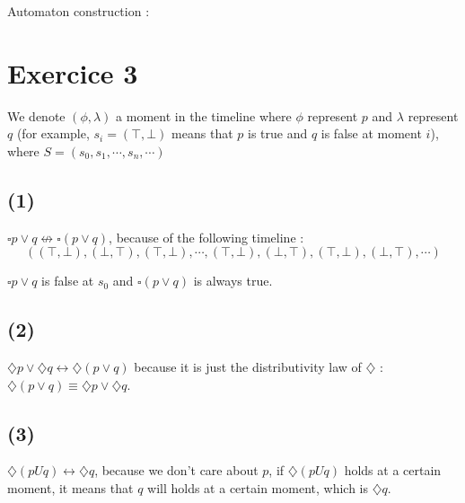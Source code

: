 \documentclass[a4paper,11pt]{report}
\newcommand*{\until}{U}
\newcommand*{\disj}{\ ,\ }
\newcommand*{\A}{\square}  %
\newcommand*{\D}{\diamondsuit} %
\newcommand*{\Pq}{(\top,\bot)}
\newcommand*{\pQ}{(\bot,\top)}
\begin{document}
Automaton construction :

\begin{center}
\end{center}

\section*{Exercice 3}

We denote $(\phi,\lambda)$ a moment in the timeline where $\phi$
represent $p$ and $\lambda$ represent $q$ (for example, $s_i = (\top,\bot)$
means that $p$ is true and $q$ is false at moment $i$), where $S = (s_0,s_1,\cdots,s_n,\cdots)$

\subsection*{(1)}

$\A p \vee q \not\leftrightarrow \A (p \vee q)$, because of the following
timeline :
\[
  (\Pq,\pQ,\Pq,\cdots,\Pq,\pQ,\Pq,\pQ,\cdots)
\]

$\A p \vee q$ is false at $s_0$ and $\A (p \vee q)$ is always true.

\subsection*{(2)}

$\D p \vee \D q \leftrightarrow \D (p \vee q)$ because it is just the
distributivity law of $\D$ : $\D (p \vee q) \equiv \D p \vee \D q$.

\subsection*{(3)}

$\D (p \until q) \leftrightarrow \D q$, because we don't care about $p$, if $\D
(p \until q)$ holds at a certain moment, it means that $q$ will holds at a
certain moment, which is $\D q$.
\end{document}
